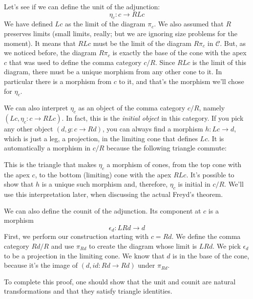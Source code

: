 \documentclass[11pt]{amsart}
\newcommand{\cat}[1]{\mathcal{#1}}
\begin{document}
Let's see if we can define the unit of the adjunction:
\[ \eta_c : c \to R L c\]
We have defined $L c$ as the limit of the diagram $\pi_c$. We also assumed that $R$ preserves limits (small limits, really; but we are ignoring size problems for the moment). It means that $R L c$ must be the limit of the diagram $R \pi_c$ in $\cat C$. But, as we noticed before, the diagram  $R \pi_c$ is exactly the base of the cone with the apex $c$ that was used to define the comma category $c/R$. Since $R L c$ is the limit of this diagram, there must be a unique morphism from any other cone to it. In particular there is a morphism from $c$ to it, and that's the morphism we'll chose for $\eta_c$. 

We can also interpret $\eta_c$ as an object of the comma category $c/R$, namely $(Lc, \eta_c \colon c \to R L c)$. In fact, this is the \emph{initial object} in this category. If you pick any other object $(d, g \colon c \to R d)$, you can always find a morphism $h \colon L c \to d$, which is just a leg, a projection, in the limiting cone that defines $L c$. It is automatically a morphism in $c/R$ because the following triangle commute:

\begin{figure}[H]
\centering
\end{figure}
This is the triangle that makes $\eta_c$ a morphism of cones, from the top cone with the apex $c$, to the bottom (limiting) cone with the apex $R L c$. It's possible to show that $h$ is a unique such morphism and, therefore, $\eta_c$ is initial in $c/R$. We'll use this interpretation later, when discussing the actual Freyd's theorem.

We can also define the counit of the adjunction. Its component at $c$ is a morphism
\[\epsilon_d : L R d \to d \]
First, we perform our construction starting with $c = R d$. We define the comma category $R d / R$ and use $\pi_{R d}$ to create the diagram whose limit is $L R d$. We pick $\epsilon_d$ to be a projection in the limiting cone. We know that $d$ is in the base of the cone, because it's the image of $(d, id \colon R d \to R d)$ under $\pi_{R d}$. 

To complete this proof, one should show that the unit and counit are natural transformations and that they satisfy triangle identities. 
\end{document}
